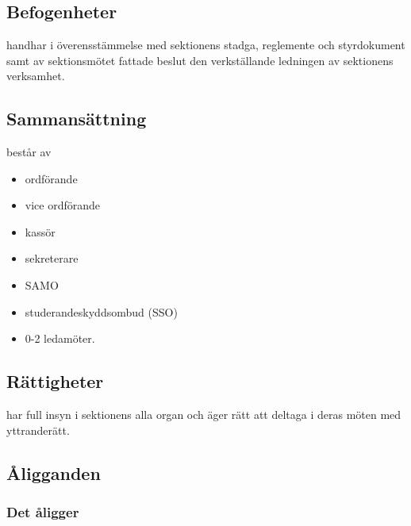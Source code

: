 \section{\STYRITFULL}
 
\subsection{Befogenheter}
\STYRIT{} handhar i överensstämmelse med sektionens stadga, reglemente och
styrdokument samt av sektionsmötet fattade beslut den verkställande
ledningen av sektionens verksamhet.
 
\subsection{Sammansättning}
\STYRIT{} består av
\begin{itemize}
	\item ordförande
	\item vice ordförande
	\item kassör
	\item sekreterare
	\item SAMO
    \item studerandeskyddsombud (SSO)
	\item 0-2 ledamöter.
\end{itemize} 
 
\subsection{Rättigheter}
\STYRIT{} har full insyn i sektionens alla organ och äger rätt att deltaga i deras
möten med yttranderätt.
  
\subsection{Åligganden}

\subsubsection{Det åligger \STYRIT}

